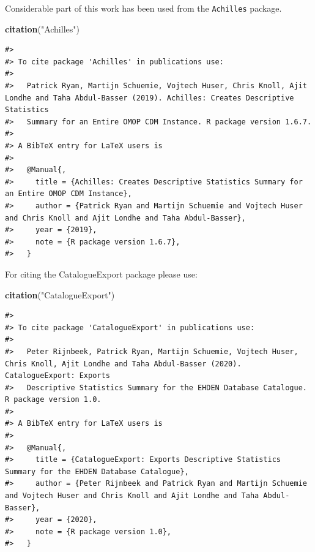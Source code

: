\documentclass[
]{article}
\newenvironment{Shaded}{\begin{snugshade}}{\end{snugshade}}
\newcommand{\KeywordTok}[1]{\textcolor[rgb]{0.13,0.29,0.53}{\textbf{#1}}}
\newcommand{\NormalTok}[1]{#1}
\newcommand{\StringTok}[1]{\textcolor[rgb]{0.31,0.60,0.02}{#1}}
\begin{document}
Considerable part of this work has been used from the \texttt{Achilles}
package.

\begin{Shaded}
\begin{Highlighting}[]
\KeywordTok{citation}\NormalTok{(}\StringTok{"Achilles"}\NormalTok{)}
\end{Highlighting}
\end{Shaded}

\begin{verbatim}
#> 
#> To cite package 'Achilles' in publications use:
#> 
#>   Patrick Ryan, Martijn Schuemie, Vojtech Huser, Chris Knoll, Ajit Londhe and Taha Abdul-Basser (2019). Achilles: Creates Descriptive Statistics
#>   Summary for an Entire OMOP CDM Instance. R package version 1.6.7.
#> 
#> A BibTeX entry for LaTeX users is
#> 
#>   @Manual{,
#>     title = {Achilles: Creates Descriptive Statistics Summary for an Entire OMOP CDM Instance},
#>     author = {Patrick Ryan and Martijn Schuemie and Vojtech Huser and Chris Knoll and Ajit Londhe and Taha Abdul-Basser},
#>     year = {2019},
#>     note = {R package version 1.6.7},
#>   }
\end{verbatim}

For citing the CatalogueExport package please use:

\begin{Shaded}
\begin{Highlighting}[]
\KeywordTok{citation}\NormalTok{(}\StringTok{"CatalogueExport"}\NormalTok{)}
\end{Highlighting}
\end{Shaded}

\begin{verbatim}
#> 
#> To cite package 'CatalogueExport' in publications use:
#> 
#>   Peter Rijnbeek, Patrick Ryan, Martijn Schuemie, Vojtech Huser, Chris Knoll, Ajit Londhe and Taha Abdul-Basser (2020). CatalogueExport: Exports
#>   Descriptive Statistics Summary for the EHDEN Database Catalogue. R package version 1.0.
#> 
#> A BibTeX entry for LaTeX users is
#> 
#>   @Manual{,
#>     title = {CatalogueExport: Exports Descriptive Statistics Summary for the EHDEN Database Catalogue},
#>     author = {Peter Rijnbeek and Patrick Ryan and Martijn Schuemie and Vojtech Huser and Chris Knoll and Ajit Londhe and Taha Abdul-Basser},
#>     year = {2020},
#>     note = {R package version 1.0},
#>   }
\end{verbatim}
\end{document}
